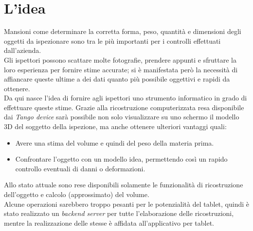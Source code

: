 \section{L'idea}

Mansioni come determinare la corretta forma, peso, quantità e dimensioni degli oggetti da ispezionare sono tra le più importanti per i controlli effettuati dall'azienda.\\
Gli ispettori possono scattare molte fotografie, prendere appunti e sfruttare la loro esperienza per fornire stime accurate; si è manifestata però la necessità di affiancare queste ultime a dei dati quanto più possibile oggettivi e rapidi da ottenere.\\
Da qui nasce l'idea di fornire agli ispettori uno strumento informatico in grado di effettuare queste stime. Grazie alla ricostruzione computerizzata resa disponibile dai \emph{Tango device} sarà possibile non solo visualizzare su uno schermo il modello 3D del soggetto della ispezione, ma anche ottenere ulteriori vantaggi quali:
\begin{itemize}
	\item Avere una stima del volume e quindi del peso della materia prima.
	\item Confrontare l'oggetto con un modello idea, permettendo così un rapido controllo eventuali di danni o deformazioni.
\end{itemize}
Allo stato attuale sono rese disponibili solamente le funzionalità di ricostruzione dell'oggetto e calcolo (approssimato) del volume.\\
Alcune operazioni sarebbero troppo pesanti per le potenzialità del tablet, quindi è stato realizzato un \emph{backend server} per tutte l'elaborazione delle ricostruzioni, mentre la realizzazione delle stesse è affidata all'applicativo per tablet.

